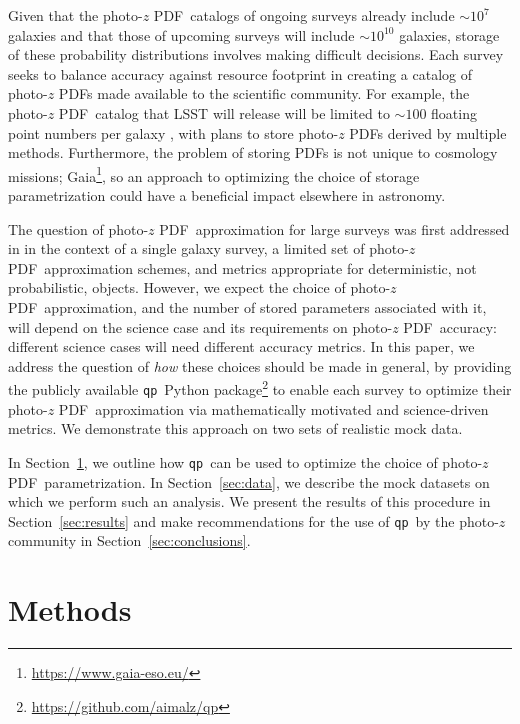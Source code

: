 \documentclass[\docopts]{\docclass}
\newcommand{\qp}{\texttt{qp}}
\newcommand{\pz}{photo-$z$ PDF}
\begin{document}
Given that the \pz\ catalogs of ongoing surveys already include $\sim10^{7}$ 
galaxies and that those of upcoming surveys will include $\sim10^{10}$ 
galaxies, storage of these probability distributions involves making difficult 
decisions.
Each survey seeks to balance accuracy against resource footprint in creating a 
catalog of \pz s made available to the scientific community.
For example, the \pz\ catalog that LSST will release will be limited to 
$\sim100$ floating point numbers per galaxy \citep[section 
4.2.2]{juric_data_2017}, with plans to store \pz s derived by multiple methods.
Furthermore, the problem of storing PDFs is not unique to cosmology missions; 
Gaia\footnote{\url{https://www.gaia-eso.eu/}}, so an approach to optimizing the 
choice of storage parametrization could have a beneficial impact elsewhere in 
astronomy.

The question of \pz\ approximation for large surveys was first addressed in 
\citet{carrasco_kind_sparse_2014} in the context of a single galaxy survey, a 
limited set of \pz\ approximation schemes, and metrics appropriate for 
deterministic, not probabilistic, objects.
However, we expect the choice of \pz\ approximation, and the number of stored 
parameters associated with it, will depend on the science case and its 
requirements on \pz\ accuracy: different science cases will need different 
accuracy metrics.
In this paper, we address the question of \textit{how} these choices should be 
made in general, by providing the publicly available \qp\ Python 
package\footnote{\url{https://github.com/aimalz/qp}} to enable each survey to 
optimize their \pz\ approximation via mathematically motivated and 
science-driven metrics.
We demonstrate this approach on two sets of realistic mock data.

In Section~\ref{sec:methods}, we outline how \qp\ can be used to optimize the 
choice of \pz\ parametrization.
In Section~\ref{sec:data}, we describe the mock datasets on which we perform 
such an analysis.
We present the results of this procedure in Section~\ref{sec:results} and make 
recommendations for the use of \qp\ by the photo-$z$ community in 
Section~\ref{sec:conclusions}.

\section{Methods}
\label{sec:methods}
\end{document}
